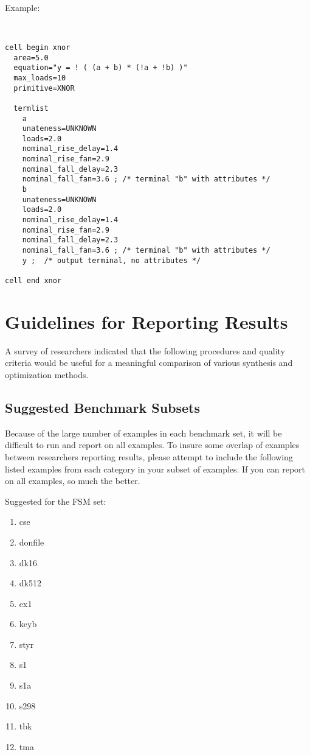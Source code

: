 {\begin{pespace}
Example:

\begin{verbatim}


cell begin xnor
  area=5.0
  equation="y = ! ( (a + b) * (!a + !b) )"  
  max_loads=10
  primitive=XNOR 

  termlist
    a
    unateness=UNKNOWN
    loads=2.0 
    nominal_rise_delay=1.4
    nominal_rise_fan=2.9
    nominal_fall_delay=2.3
    nominal_fall_fan=3.6 ; /* terminal "b" with attributes */
    b
    unateness=UNKNOWN
    loads=2.0 
    nominal_rise_delay=1.4
    nominal_rise_fan=2.9
    nominal_fall_delay=2.3
    nominal_fall_fan=3.6 ; /* terminal "b" with attributes */
    y ;  /* output terminal, no attributes */

cell end xnor

\end{verbatim}



\newpage
\section{ Guidelines for Reporting Results}

A survey of researchers 
indicated that the following procedures
and quality criteria would be useful for a meaningful
comparison of various synthesis and optimization methods.

\vspace*{0.5cm}
\subsection{Suggested Benchmark Subsets}

Because of the large number of examples in each benchmark set, it will
be difficult to run and report on all examples.  
To insure some overlap of examples between researchers reporting results,
please attempt to include the following listed examples from each category in
your subset of examples.
If you can report on all examples, so much the better.  

\vspace*{0.5in}


Suggested for the FSM set:
\begin{enumerate}
\item cse
\item donfile
\item dk16
\item dk512
\item ex1
\item keyb
\item styr
\item s1
\item s1a
\item s298
\item tbk
\item tma
\end{enumerate}



\end{pespace}}
